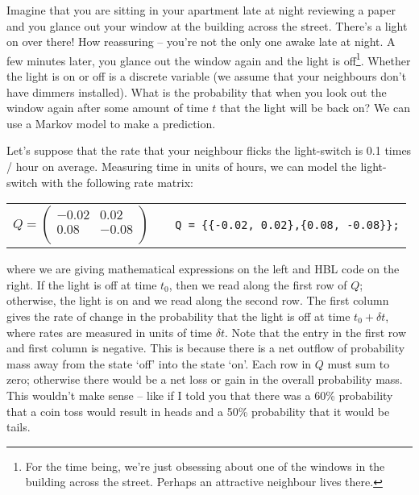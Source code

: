 \documentclass[12pt,twoside,openright]{book}
\begin{document}
Imagine that you are sitting in your apartment late at night reviewing a paper and you glance out your window at the building across the street.  There's a light on over there!  How reassuring -- you're not the only one awake late at night.  A few minutes later, you glance out the window again and the light is off\footnote{For the time being, we're just obsessing about one of the windows in the building across the street.  Perhaps an attractive neighbour lives there.}.  Whether the light is on or off is a discrete variable (we assume that your neighbours don't have dimmers installed).  What is the probability that when you look out the window again after some amount of time $t$ that the light will be back on?  We can use a Markov model to make a prediction.

Let's suppose that the rate that your neighbour flicks the light-switch is 0.1 times / hour on average.   
Measuring time in units of hours, we can model the light-switch with the following rate matrix:

\begin{center}
\begin{tabular}{ccc}
$Q = \left (
\begin{array}{cc}
-0.02 & 0.02\\
0.08 & -0.08\\
\end{array}
\right )$
& 
\hfill
&
{\tt Q = \{\{-0.02, 0.02\},\{0.08, -0.08\}\};}\\
\end{tabular}
\end{center}

\noindent where we are giving mathematical expressions on the left and HBL code on the right.  If the light is off at time $t_0$, then we read along the first row of $Q$; otherwise, the light is on and we read along the second row.  The first column gives the rate of change in the probability that the light is off at time $t_0+\delta t$, where rates are measured in units of time $\delta t$.  Note that the entry in the first row and first column is negative.  This is because there is a net outflow of probability mass away from the state `off' into the state `on'.  Each row in $Q$ must sum to zero; otherwise there would be a net loss or gain in the overall probability mass.  This wouldn't make sense -- like if I told you that there was a 60\% probability that a coin toss would result in heads and a 50\% probability that it would be tails.  
\end{document}
